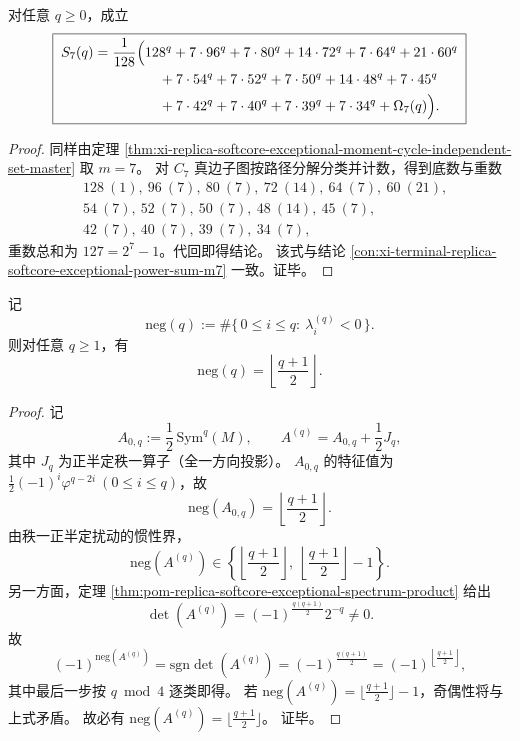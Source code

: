 \begin{corollary}[七次幂和的完全闭式]\label{cor:xi-replica-softcore-exceptional-power-sum-m7-complete-closed}
对任意 \(q\ge 0\)，成立
\[
\boxed{\;
\begin{aligned}
S_7(q)=\frac1{128}\Bigl(
&128^q+7\cdot 96^q+7\cdot 80^q+14\cdot 72^q+7\cdot 64^q+21\cdot 60^q\\
&\quad+7\cdot 54^q+7\cdot 52^q+7\cdot 50^q+14\cdot 48^q+7\cdot 45^q\\
&\quad+7\cdot 42^q+7\cdot 40^q+7\cdot 39^q+7\cdot 34^q+\Omega_7(q)
\Bigr).
\end{aligned}
\;}
\]
\end{corollary}
\begin{proof}
同样由定理
\ref{thm:xi-replica-softcore-exceptional-moment-cycle-independent-set-master}
取 \(m=7\)。
对 \(C_7\) 真边子图按路径分解分类并计数，得到底数与重数
\[
\begin{aligned}
&128\ (1),\ 96\ (7),\ 80\ (7),\ 72\ (14),\ 64\ (7),\ 60\ (21),\\
&54\ (7),\ 52\ (7),\ 50\ (7),\ 48\ (14),\ 45\ (7),\\
&42\ (7),\ 40\ (7),\ 39\ (7),\ 34\ (7),
\end{aligned}
\]
重数总和为 \(127=2^7-1\)。代回即得结论。
该式与结论 \ref{con:xi-terminal-replica-softcore-exceptional-power-sum-m7} 一致。证毕。
\end{proof}

\begin{theorem}[例外谱的惯性指数刚性]\label{thm:xi-replica-softcore-exceptional-inertia-index-rigidity-floor}
记
\[
\mathrm{neg}(q):=\#\{\,0\le i\le q:\ \lambda_i^{(q)}<0\,\}.
\]
则对任意 \(q\ge 1\)，有
\[
\boxed{\;\mathrm{neg}(q)=\left\lfloor\frac{q+1}{2}\right\rfloor.\;}
\]
\end{theorem}
\begin{proof}
记
\[
A_{0,q}:=\frac12\,\mathrm{Sym}^q(M),\qquad
A^{(q)}=A_{0,q}+\frac12J_q,
\]
其中 \(J_q\) 为正半定秩一算子（全一方向投影）。
\(A_{0,q}\) 的特征值为
\(
\frac12(-1)^i\varphi^{q-2i}\ (0\le i\le q)
\)，故
\[
\mathrm{neg}(A_{0,q})=\left\lfloor\frac{q+1}{2}\right\rfloor.
\]
由秩一正半定扰动的惯性界，
\[
\mathrm{neg}(A^{(q)})\in
\left\{
\left\lfloor\frac{q+1}{2}\right\rfloor,\ 
\left\lfloor\frac{q+1}{2}\right\rfloor-1
\right\}.
\]
另一方面，定理 \ref{thm:pom-replica-softcore-exceptional-spectrum-product} 给出
\[
\det(A^{(q)})=(-1)^{\frac{q(q+1)}2}2^{-q}\neq 0.
\]
故
\[
(-1)^{\mathrm{neg}(A^{(q)})}
=\mathrm{sgn}\det(A^{(q)})
=(-1)^{\frac{q(q+1)}2}
=(-1)^{\left\lfloor\frac{q+1}{2}\right\rfloor},
\]
其中最后一步按 \(q\bmod 4\) 逐类即得。
若 \(\mathrm{neg}(A^{(q)})=\lfloor\frac{q+1}{2}\rfloor-1\)，奇偶性将与上式矛盾。
故必有
\(
\mathrm{neg}(A^{(q)})=\lfloor\frac{q+1}{2}\rfloor
\)。
证毕。
\end{proof}

